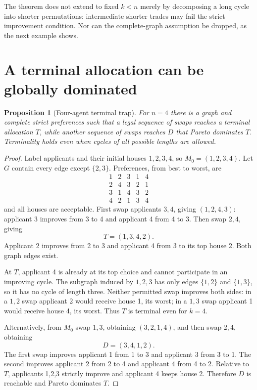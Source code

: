 \documentclass[11pt,a4paper]{article}
\newtheorem{proposition}[theorem]{Proposition}
\theoremstyle{definition}
\theoremstyle{remark}
\begin{document}
The theorem does not extend to fixed $k<n$ merely by decomposing a long cycle into shorter permutations: intermediate shorter trades may fail the strict improvement condition. Nor can the complete-graph assumption be dropped, as the next example shows.

\section{A terminal allocation can be globally dominated}
\begin{proposition}[Four-agent terminal trap]\label{pr:trap}
For $n=4$ there is a graph and complete strict preferences such that a legal sequence of swaps reaches a terminal allocation $T$, while another sequence of swaps reaches $D$ that Pareto dominates $T$. Terminality holds even when cycles of all possible lengths are allowed.
\end{proposition}
\begin{proof}
Label applicants and their initial houses $1,2,3,4$, so $M_0=(1,2,3,4)$. Let $G$ contain every edge except $\{2,3\}$. Preferences, from best to worst, are
\[
\begin{array}{c|cccc}
1&2&3&1&4\\
2&4&3&2&1\\
3&1&4&3&2\\
4&2&1&3&4
\end{array}
\]
and all houses are acceptable. First swap applicants $3,4$, giving $(1,2,4,3)$: applicant 3 improves from 3 to 4 and applicant 4 from 4 to 3. Then swap $2,4$, giving
\[
 T=(1,3,4,2).
\]
Applicant 2 improves from 2 to 3 and applicant 4 from 3 to its top house 2. Both graph edges exist.

At $T$, applicant 4 is already at its top choice and cannot participate in an improving cycle. The subgraph induced by $1,2,3$ has only edges $\{1,2\}$ and $\{1,3\}$, so it has no cycle of length three. Neither permitted swap improves both sides: in a $1,2$ swap applicant 2 would receive house 1, its worst; in a $1,3$ swap applicant 1 would receive house 4, its worst. Thus $T$ is terminal even for $k=4$.

Alternatively, from $M_0$ swap $1,3$, obtaining $(3,2,1,4)$, and then swap $2,4$, obtaining
\[
 D=(3,4,1,2).
\]
The first swap improves applicant 1 from 1 to 3 and applicant 3 from 3 to 1. The second improves applicant 2 from 2 to 4 and applicant 4 from 4 to 2. Relative to $T$, applicants 1,2,3 strictly improve and applicant 4 keeps house 2. Therefore $D$ is reachable and Pareto dominates $T$.
\end{proof}
\end{document}
